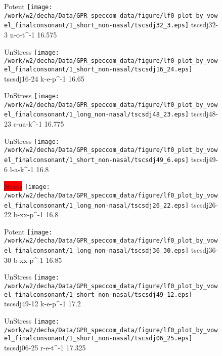 \documentclass{article}
\begin{document}
\begin{figure}[t]
\begin{minipage}[b]{.24\textwidth}
\colorbox{Apricot}{Potent}
\centering
\texttt{[image: /work/w2/decha/Data/GPR\_speccom\_data/figure/lf0\_plot\_by\_vowel\_finalconsonant/1\_short\_non-nasal/tscsdj32\_3.eps]}
tscsdj32-3 n-o-t\textasciicircum-1 16.575
\end{minipage}
\begin{minipage}[b]{.24\textwidth}
UnStress
\centering
\texttt{[image: /work/w2/decha/Data/GPR\_speccom\_data/figure/lf0\_plot\_by\_vowel\_finalconsonant/1\_short\_non-nasal/tscsdj16\_24.eps]}
tscsdj16-24 k-e-p\textasciicircum-1 16.65
\end{minipage}
\begin{minipage}[b]{.24\textwidth}
UnStress
\centering
\texttt{[image: /work/w2/decha/Data/GPR\_speccom\_data/figure/lf0\_plot\_by\_vowel\_finalconsonant/1\_long\_non-nasal/tscsdj48\_23.eps]}
tscsdj48-23 c-aa-k\textasciicircum-1 16.775
\end{minipage}
\begin{minipage}[b]{.24\textwidth}
UnStress
\centering
\texttt{[image: /work/w2/decha/Data/GPR\_speccom\_data/figure/lf0\_plot\_by\_vowel\_finalconsonant/1\_short\_non-nasal/tscsdj49\_6.eps]}
tscsdj49-6 l-a-k\textasciicircum-1 16.8
\end{minipage}
\end{figure}
\clearpage
\begin{figure}[t]
\begin{minipage}[b]{.24\textwidth}
\colorbox{red}{Stress}
\centering
\texttt{[image: /work/w2/decha/Data/GPR\_speccom\_data/figure/lf0\_plot\_by\_vowel\_finalconsonant/1\_long\_non-nasal/tscsdj26\_22.eps]}
tscsdj26-22 b-xx-p\textasciicircum-1 16.8
\end{minipage}
\begin{minipage}[b]{.24\textwidth}
\colorbox{Apricot}{Potent}
\centering
\texttt{[image: /work/w2/decha/Data/GPR\_speccom\_data/figure/lf0\_plot\_by\_vowel\_finalconsonant/1\_long\_non-nasal/tscsdj36\_30.eps]}
tscsdj36-30 b-xx-p\textasciicircum-1 16.85
\end{minipage}
\begin{minipage}[b]{.24\textwidth}
UnStress
\centering
\texttt{[image: /work/w2/decha/Data/GPR\_speccom\_data/figure/lf0\_plot\_by\_vowel\_finalconsonant/1\_short\_non-nasal/tscsdj49\_12.eps]}
tscsdj49-12 k-e-p\textasciicircum-1 17.2
\end{minipage}
\begin{minipage}[b]{.24\textwidth}
UnStress
\centering
\texttt{[image: /work/w2/decha/Data/GPR\_speccom\_data/figure/lf0\_plot\_by\_vowel\_finalconsonant/1\_short\_non-nasal/tscsdj06\_25.eps]}
tscsdj06-25 r-e-t\textasciicircum-1 17.325
\end{minipage}
\end{figure}
\end{document}
